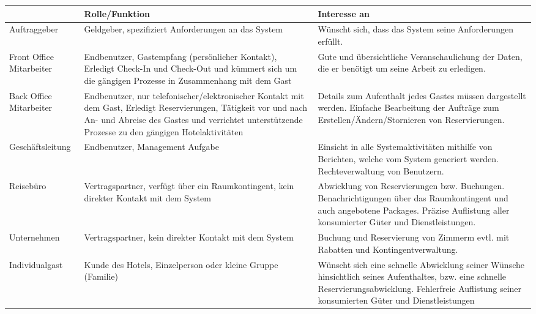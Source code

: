 \centering
\begin{longtable}{|p{3.5cm}|p{5cm}|p{6cm}|}
    \hline
    & Rolle/Funktion & Interesse an \\       \hline

    Auftraggeber &
    Geldgeber, spezifiziert Anforderungen an das System &
    Wünscht sich, dass das System seine Anforderungen erfüllt.
    \\       \hline

    Front Office Mitarbeiter &
    Endbenutzer, Gastempfang (persönlicher Kontakt), Erledigt Check-In und Check-Out und kümmert sich um die gängigen Prozesse in Zusammenhang mit dem Gast  &
    Gute und übersichtliche Veranschaulichung der Daten, die er benötigt um seine Arbeit zu erledigen.
    \\       \hline

    Back Office Mitarbeiter &
    Endbenutzer, nur telefonischer/elektronischer Kontakt mit dem Gast, Erledigt Reservierungen, Tätigkeit vor und nach An- und Abreise des Gastes und verrichtet unterstützende Prozesse zu den gängigen Hotelaktivitäten &
    Details zum Aufenthalt jedes Gastes müssen dargestellt werden. Einfache Bearbeitung der Aufträge zum Erstellen/Ändern/Stornieren von Reservierungen.
    \\       \hline

    Geschäftsleitung &
    Endbenutzer, Management Aufgabe &
    Einsicht in alle Systemaktivitäten mithilfe von Berichten, welche vom System generiert werden.
    Rechteverwaltung von Benutzern.
    \\       \hline

    Reisebüro &
    Vertragspartner, verfügt über ein Raumkontingent, kein direkter Kontakt mit dem System &
    Abwicklung von Reservierungen bzw. Buchungen. Benachrichtigungen über das Raumkontingent und auch angebotene
    Packages. Präzise Auflistung aller konsumierter Güter und Dienstleistungen.
    \\       \hline

    Unternehmen &
    Vertragspartner, kein direkter Kontakt mit dem System &
    Buchung und Reservierung von Zimmerm evtl. mit Rabatten und Kontingentverwaltung.
    \\       \hline

    Individualgast &
    Kunde des Hotels, Einzelperson oder kleine Gruppe (Familie) &
    Wünscht sich eine schnelle Abwicklung seiner Wünsche hinsichtlich seines Aufenthaltes, bzw. eine schnelle Reservierungsabwicklung.
    Fehlerfreie Auflistung seiner konsumierten Güter und Dienstleistungen
    \\       \hline


\end{longtable}
